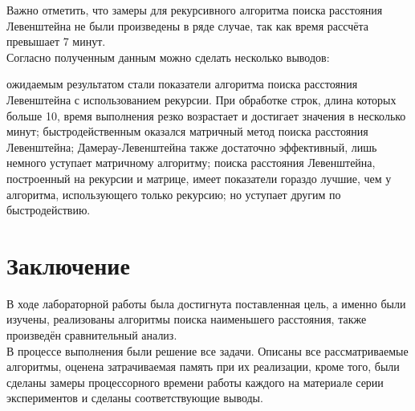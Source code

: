 \documentclass[12pt]{report}
\begin{document}
Важно отметить, что замеры для рекурсивного алгоритма поиска расстояния Левенштейна не были произведены в ряде случае, так как время рассчёта превышает 7 минут.\\

Согласно полученным данным можно сделать несколько выводов:
\begin{itemize}
	 ожидаемым результатом стали показатели алгоритма поиска расстояния Левенштейна с использованием рекурсии. При обработке строк, длина которых больше 10, время выполнения резко возрастает и достигает значения в несколько минут;
	 быстродейственным оказался матричный метод поиска расстояния Левенштейна;
	 Дамерау-Левенштейна также достаточно эффективный, лишь немного уступает матричному алгоритму;
	 поиска расстояния Левенштейна, построенный на рекурсии и матрице, имеет показатели гораздо лучшие, чем у алгоритма, использующего только рекурсию; но уступает другим по быстродействию.
\end{itemize}

\chapter*{Заключение}
В ходе лабораторной работы была достигнута поставленная цель, а именно были изучены, реализованы алгоритмы поиска наименьшего расстояния, также произведён сравнительный анализ. \\

В процессе выполнения были решение все задачи. Описаны все рассматриваемые алгоритмы, оценена затрачиваемая память при их реализации, кроме того, были сделаны замеры процессорного времени работы каждого на материале серии экспериментов и сделаны соответствующие выводы.
\end{document}

